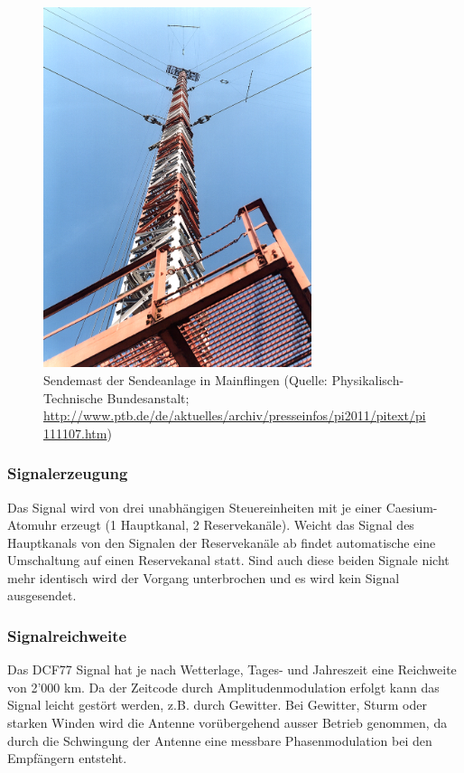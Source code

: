 \begin{figure}
  \begin{center}
    \includegraphics[width=0.7\textwidth]{./images/Analyse/DCF77_Mainflingen_Nah.jpg}
  \end{center}
  \caption[Sendemast der Sendeanlage in Mainflingen]{Sendemast der Sendeanlage in Mainflingen (Quelle: Physikalisch-Technische Bundesanstalt; \url{http://www.ptb.de/de/aktuelles/archiv/presseinfos/pi2011/pitext/pi111107.htm})} 
\end{figure}

\subsubsection{Signalerzeugung}
Das Signal wird von drei unabhängigen Steuereinheiten mit je einer Caesium-Atomuhr erzeugt (1 Hauptkanal, 2 Reservekanäle). Weicht das Signal des Hauptkanals von den Signalen der Reservekanäle ab findet automatische eine Umschaltung auf einen Reservekanal statt. Sind auch diese beiden Signale nicht mehr identisch wird der Vorgang unterbrochen und es wird kein Signal ausgesendet.

\subsubsection{Signalreichweite}
Das DCF77 Signal hat je nach Wetterlage, Tages- und Jahreszeit eine Reichweite von 2'000 km. Da der Zeitcode durch Amplitudenmodulation erfolgt kann das Signal leicht gestört werden, z.B. durch Gewitter. Bei Gewitter, Sturm oder starken Winden wird die Antenne vorübergehend ausser Betrieb genommen, da durch die Schwingung der Antenne eine messbare Phasenmodulation bei den Empfängern entsteht.

